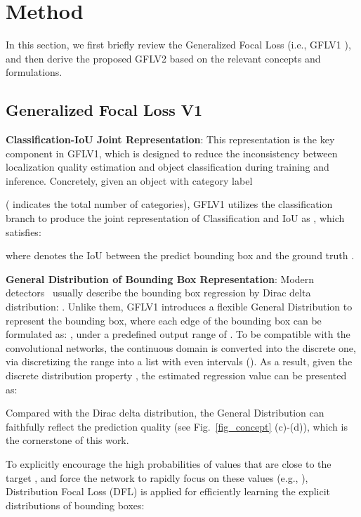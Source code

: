 \documentclass[10pt,twocolumn,letterpaper]{article}
\begin{document}
\section{Method}
In this section, we first 
briefly review the
Generalized Focal Loss (i.e., GFLV1 \cite{li2020generalized}), and then derive the proposed GFLV2 based on the relevant 
concepts and formulations.

\subsection{Generalized Focal Loss V1}
\noindent \textbf{Classification-IoU Joint Representation}: 
This representation
is 
the key
component in GFLV1, which is designed to 
reduce the inconsistency between localization quality estimation and object classification during training and inference.
Concretely,
given an object with category label 
 
( 
indicates
the total number of categories),
GFLV1 utilizes the classification branch to produce the joint representation of Classification and IoU as , which 
satisfies:

where  denotes the IoU between the predict bounding box  and the ground truth .
\iffalse

\fi
\iffalse
To achieve this goal, GFLV1 utilizes Quality Focal Loss (QFL) that enables its successful learning:

where for label vector  we have  and .
\fi

\noindent \textbf{General Distribution of Bounding Box Representation}: 
Modern detectors~\cite{ren2015faster,lin2017focal,tian2019fcos} usually describe the bounding box regression by Dirac delta distribution: . 
Unlike them, GFLV1 introduces a flexible General Distribution  to represent the bounding box, where each edge of the bounding box can be formulated as: , under a predefined output range of . 
To be compatible with the convolutional networks, the continuous domain is converted into the discrete one, via discretizing the range  into a list  with even intervals  (). As a result, given the discrete distribution property , the estimated regression value  can be presented as:



Compared with the Dirac delta distribution, the General Distribution  can faithfully reflect the prediction quality (see Fig.~\ref{fig_concept} (c)-(d)), which is the cornerstone of this work.


\iffalse
To explicitly encourage the high probabilities of values that are close to the target , and force the network to rapidly focus on these values (e.g., ), Distribution Focal Loss (DFL) is applied for efficiently learning the explicit distributions of bounding boxes:
\end{document}
